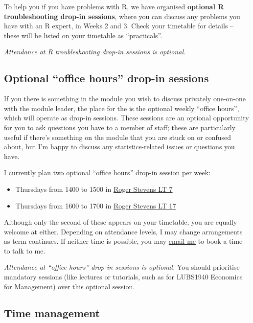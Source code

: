 \documentclass[
  letterpaper,
]{report}
\providecommand{\tightlist}{%
  \setlength{\itemsep}{0pt}\setlength{\parskip}{0pt}}\usepackage{longtable,booktabs,array}
\theoremstyle{definition}
\theoremstyle{definition}
\theoremstyle{remark}
\begin{document}
To help you if you have problems with R, we have organised
\textbf{optional R troubleshooting drop-in sessions}, where you can
discuss any problems you have with an R expert, in Weeks 2 and 3. Check
your timetable for details -- these will be listed on your timetable as
``practicals''.

\emph{Attendance at R troubleshooting drop-in sessions is optional.}

\hypertarget{dropin}{%
\subsection*{Optional ``office hours'' drop-in sessions}\label{dropin}}

If you there is something in the module you wish to discuss privately
one-on-one with the module leader, the place for the is the optional
weekly ``office hours'', which will operate as drop-in sessions. These
sessions are an optional opportunity for you to ask questions you have
to a member of staff; these are particularly useful if there's something
on the module that you are stuck on or confused about, but I'm happy to
discuss any statistics-related issues or questions you have.

I currently plan two optional ``office hours'' drop-in session per week:

\begin{itemize}
\tightlist
\item
  Thursdays from 1400 to 1500 in
  \href{https://students.leeds.ac.uk/rooms?type=room\&id=100031}{Roger
  Stevens LT 7}
\item
  Thursdays from 1600 to 1700 in
  \href{https://students.leeds.ac.uk/rooms?type=room\&id=100041}{Roger
  Stevens LT 17}
\end{itemize}

Although only the second of these appears on your timetable, you are
equally welcome at either. Depending on attendance levels, I may change
arrangements as term continues. If neither time is possible, you may
\href{mailto:m.aldridge@leeds.ac.uk}{email me} to book a time to talk to
me.

\emph{Attendance at ``office hours'' drop-in sessions is optional.} You
should prioritise mandatory sessions (like lectures or tutorials, such
as for LUBS1940 Economics for Management) over this optional session.

\hypertarget{time}{%
\subsection*{Time management}\label{time}}
\end{document}
